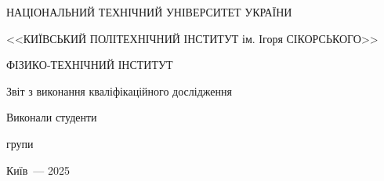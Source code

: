 \thispagestyle{empty}

\begin{center}
НАЦІОНАЛЬНИЙ ТЕХНІЧНИЙ УНІВЕРСИТЕТ УКРАЇНИ \par
<<КИЇВСЬКИЙ ПОЛІТЕХНІЧНИЙ ІНСТИТУТ ім. Ігоря СІКОРСЬКОГО>>\par
ФІЗИКО-ТЕХНІЧНИЙ ІНСТИТУТ\par

\vspace{40mm}
{\huge Звіт з виконання кваліфікаційного дослідження \par}

\huge\MakeUppercase{\textbf{\reportTitle}} \par
\end{center}

\vspace{40mm}
\begin{flushright}
Виконали студенти

групи \reportAuthorGroup

\reportAuthor

\vspace{15mm}

\end{flushright}

\vspace{30mm}
\begin{center}
{Київ~--- 2025}
\end{center}

\newpage
